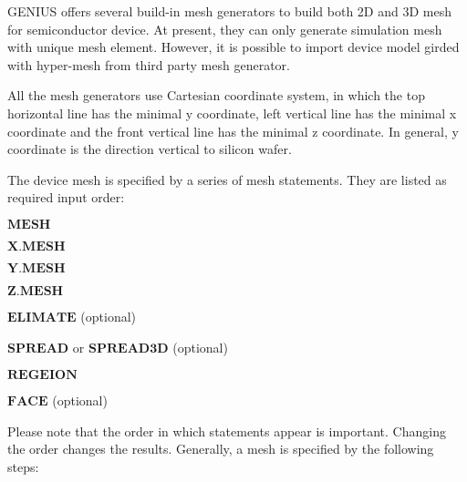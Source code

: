 \documentclass[oneside,12pt]{cgd_book}
\begin{document}
GENIUS offers several build-in mesh generators to build both 2D and 3D mesh for semiconductor device. At
      present, they can only generate simulation mesh with unique mesh element. However, it is possible to import device
      model girded with hyper-mesh from third party mesh generator.
\par
{}All the mesh generators use Cartesian coordinate system, in which the top horizontal line has the minimal
        y coordinate, left vertical line has the minimal x coordinate and the front vertical line has the minimal z
        coordinate. In general, y coordinate is the direction vertical to silicon wafer.
\par
\par
{}The device mesh is specified by a series of mesh statements. They are listed as required input
        order:
\par
\par
\begin{compactitem}
\item $\mathbf{MESH}$
\par
\item $\mathbf{X.MESH}$
\par
\item $\mathbf{Y.MESH}$
\par
\item $\mathbf{Z.MESH}$
\par
\item $\mathbf{ELIMATE}$ (optional)
\par
\item $\mathbf{SPREAD}$ or $\mathbf{SPREAD3D}$ (optional)
\par
\item $\mathbf{REGEION}$
\par
\item $\mathbf{FACE}$ (optional)
\par
\end{compactitem}
Please note that the order in which statements appear is important. Changing the order changes the results.
      Generally, a mesh is specified by the following steps:
\par
\end{document}
